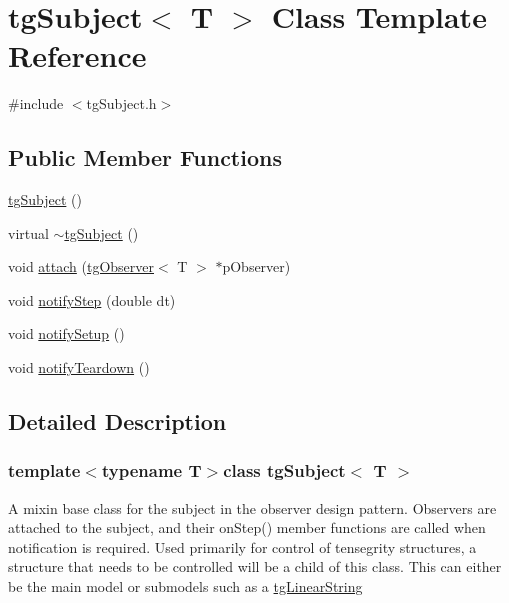 \hypertarget{classtg_subject}{\section{tg\-Subject$<$ T $>$ Class Template Reference}
\label{classtg_subject}
}


{\ttfamily \#include $<$tg\-Subject.\-h$>$}

\subsection*{Public Member Functions}
\begin{DoxyCompactItemize}
\item 
\hyperlink{classtg_subject_aca26d6636b9d6d91cec8d213d7dec262}{tg\-Subject} ()
\item 
virtual \hyperlink{classtg_subject_adba463ea10aea113b88f5eca807a51ae}{$\sim$tg\-Subject} ()
\item 
void \hyperlink{classtg_subject_a56ecfd33a048c3a7f1a884318d9af548}{attach} (\hyperlink{classtg_observer}{tg\-Observer}$<$ T $>$ $\ast$p\-Observer)
\item 
void \hyperlink{classtg_subject_ad9640aa7fcc1e0b4ce8a913a4ce1ea42}{notify\-Step} (double dt)
\item 
void \hyperlink{classtg_subject_a80799e5d0c8512d3d05a55764790392b}{notify\-Setup} ()
\item 
void \hyperlink{classtg_subject_adf7a60dbb0faf0de5528f862e7953e63}{notify\-Teardown} ()
\end{DoxyCompactItemize}


\subsection{Detailed Description}
\subsubsection*{template$<$typename T$>$class tg\-Subject$<$ T $>$}

A mixin base class for the subject in the observer design pattern. Observers are attached to the subject, and their on\-Step() member functions are called when notification is required. Used primarily for control of tensegrity structures, a structure that needs to be controlled will be a child of this class. This can either be the main model or submodels such as a \hyperlink{classtg_linear_string}{tg\-Linear\-String} 

